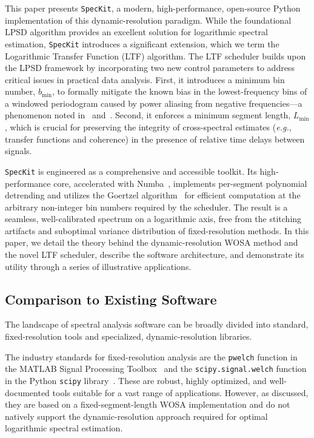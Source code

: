 \documentclass[final, 5p, times, twocolumn, number, sort&compress]{elsarticle}
\newcommand{\eg}{\textit{e.g.}}
\newcommand{\speckit}{\texttt{SpecKit}}
\newcommand{\sci}{\texttt{scipy}}
\begin{document}
This paper presents \speckit{}, a modern, high-performance, open-source Python implementation of this dynamic-resolution paradigm. While the foundational LPSD algorithm provides an excellent solution for logarithmic spectral estimation, \speckit{} introduces a significant extension, which we term the Logarithmic Transfer Function (LTF) algorithm. The LTF scheduler builds upon the LPSD framework by incorporating two new control parameters to address critical issues in practical data analysis. First, it introduces a minimum bin number, $b_{\min}$, to formally mitigate the known bias in the lowest-frequency bins of a windowed periodogram caused by power aliasing from negative frequencies---a phenomenon noted in~\cite{Troebs2006} and~\cite{Heinzel2002TN}. Second, it enforces a minimum segment length, $L_{\min}$, which is crucial for preserving the integrity of cross-spectral estimates (\eg, transfer functions and coherence) in the presence of relative time delays between signals.

\speckit{} is engineered as a comprehensive and accessible toolkit. Its high-performance core, accelerated with Numba~\cite{Numba}, implements per-segment polynomial detrending and utilizes the Goertzel algorithm~\cite{Goertzel1958} for efficient computation at the arbitrary non-integer bin numbers required by the scheduler. The result is a seamless, well-calibrated spectrum on a logarithmic axis, free from the stitching artifacts and suboptimal variance distribution of fixed-resolution methods. In this paper, we detail the theory behind the dynamic-resolution WOSA method and the novel LTF scheduler, describe the software architecture, and demonstrate its utility through a series of illustrative applications.



\subsection{Comparison to Existing Software}
\label{sec:existing-software}

The landscape of spectral analysis software can be broadly divided into standard, fixed-resolution tools and specialized, dynamic-resolution libraries.

The industry standards for fixed-resolution analysis are the \texttt{pwelch} function in the MATLAB Signal Processing Toolbox~\cite{MATLAB} and the \texttt{scipy.signal.welch} function in the Python \sci{} library~\cite{SciPy}. These are robust, highly optimized, and well-documented tools suitable for a vast range of applications. However, as discussed, they are based on a fixed-segment-length WOSA implementation and do not natively support the dynamic-resolution approach required for optimal logarithmic spectral estimation.
\end{document}
